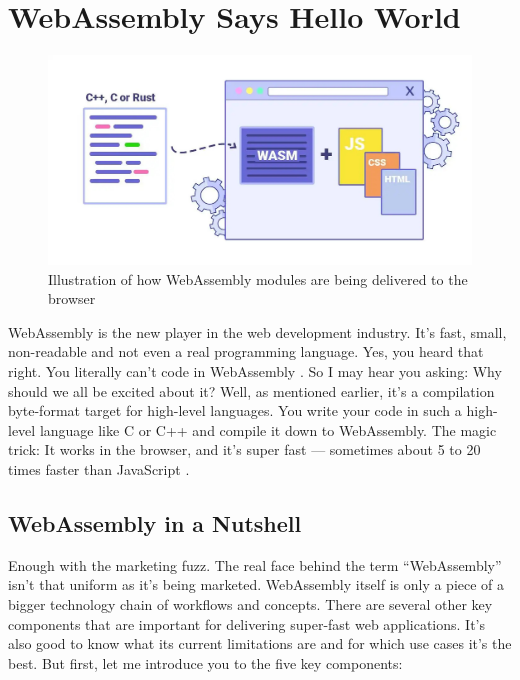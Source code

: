 \documentclass[10pt]{article}
\begin{document}
\begin{sloppypar}
  \section{WebAssembly Says Hello World}
  \label{sec:hello-world}

  \begin{figure}[ht]
    \centering
    \includegraphics[width=\textwidth]{figures/004.jpg}
    \caption{Illustration of how WebAssembly modules are being delivered to the browser \citep{logrocket_logrocket_nodate}}
    \label{fig:wasm}
  \end{figure}

  WebAssembly is the new player in the web development industry. It’s fast, small, non-readable and not even a real programming language. Yes, you heard that right. You literally can’t code in WebAssembly \citep{rourke_learn_2018}. So I may hear you asking: Why should we all be excited about it? Well, as mentioned earlier, it’s a compilation byte-format target for high-level languages. You write your code in such a high-level language like C or C++ and compile it down to WebAssembly. The magic trick: It works in the browser, and it’s super fast — sometimes about 5 to 20 times faster than JavaScript \citep{aboukhalil_how_2019}.

  \subsection{WebAssembly in a Nutshell}
  \label{sec:in-a-nutshell}

  Enough with the marketing fuzz. The real face behind the term “WebAssembly” isn’t that uniform as it’s being marketed. WebAssembly itself is only a piece of a bigger technology chain of workflows and concepts. There are several other key components that are important for delivering super-fast web applications. It’s also good to know what its current limitations are and for which use cases it’s the best. But first, let me introduce you to the five key components:


\end{sloppypar}
\end{document}

